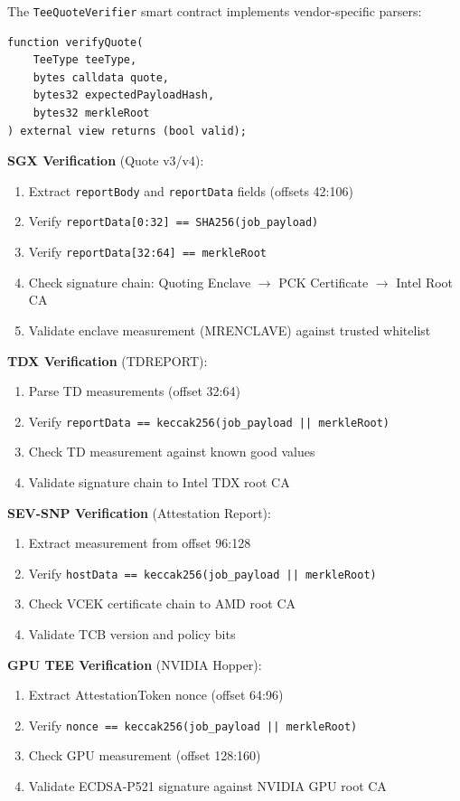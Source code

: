 The \texttt{TeeQuoteVerifier} smart contract implements vendor-specific parsers:

\begin{lstlisting}[caption={Solidity Verification Interface},label={lst:verifier}]
function verifyQuote(
    TeeType teeType,
    bytes calldata quote,
    bytes32 expectedPayloadHash,
    bytes32 merkleRoot
) external view returns (bool valid);
\end{lstlisting}

\textbf{SGX Verification} (Quote v3/v4):
\begin{enumerate}
  \item Extract \texttt{reportBody} and \texttt{reportData} fields (offsets 42:106)
  \item Verify \texttt{reportData[0:32] == SHA256(job\_payload)}
  \item Verify \texttt{reportData[32:64] == merkleRoot}
  \item Check signature chain: Quoting Enclave $\rightarrow$ PCK Certificate $\rightarrow$ Intel Root CA
  \item Validate enclave measurement (MRENCLAVE) against trusted whitelist
\end{enumerate}

\textbf{TDX Verification} (TDREPORT):
\begin{enumerate}
  \item Parse TD measurements (offset 32:64)
  \item Verify \texttt{reportData == keccak256(job\_payload || merkleRoot)}
  \item Check TD measurement against known good values
  \item Validate signature chain to Intel TDX root CA
\end{enumerate}

\textbf{SEV-SNP Verification} (Attestation Report):
\begin{enumerate}
  \item Extract measurement from offset 96:128
  \item Verify \texttt{hostData == keccak256(job\_payload || merkleRoot)}
  \item Check VCEK certificate chain to AMD root CA
  \item Validate TCB version and policy bits
\end{enumerate}

\textbf{GPU TEE Verification} (NVIDIA Hopper):
\begin{enumerate}
  \item Extract AttestationToken nonce (offset 64:96)
  \item Verify \texttt{nonce == keccak256(job\_payload || merkleRoot)}
  \item Check GPU measurement (offset 128:160)
  \item Validate ECDSA-P521 signature against NVIDIA GPU root CA
\end{enumerate}


